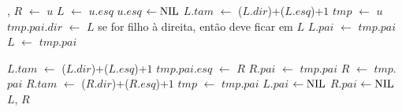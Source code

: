 \begin{algorithm}
\caption{\treapSplit($u$)}
\label{Algo:TREAPsplit}
\begin{algorithmic}[1]
 \Return \Nil, \Nil
\EndIf
\State $R$ $\gets $ $u$
\State $L$ $\gets $ $u$.$esq$
\State $u$.$esq$ $\gets\text{NIL}$
 $L$.$tam$ $\gets$ \treapGetSize($L$.$dir$)+\treapGetSize($L$.$esq$)+$1$
\EndIf
\State $tmp$ $\gets$ $u$
    \State $tmp$.$pai$.$dir$ $\gets$ $L$ \Comment se for filho à direita, então deve ficar em $L$
     $L$.$pai$ $\gets$ $tmp$.$pai$
    \EndIf
    \State $L$ $\gets$ $tmp$.$pai$

    \State $L$.$tam$ $\gets$ \treapGetSize($L$.$dir$)+\treapGetSize($L$.$esq$)+$1$
  \Else
    \State $tmp$.$pai$.$esq$ $\gets$ $R$
     $R$.$pai$ $\gets$ $tmp$.$pai$
    \EndIf
    \State $R$ $\gets$ $tmp$.$pai$
    \State $R$.$tam$ $\gets$ \treapGetSize($R$.$dir$)+\treapGetSize($R$.$esq$)+$1$
  \EndIf
  \State $tmp$ $\gets$ $tmp$.$pai$
\EndWhile
{} $L$.$pai$ $\gets\text{NIL}$\EndIf
{} $R$.$pai$ $\gets\text{NIL}$\EndIf
\State\Return $L$, $R$
\end{algorithmic}
\end{algorithm}



